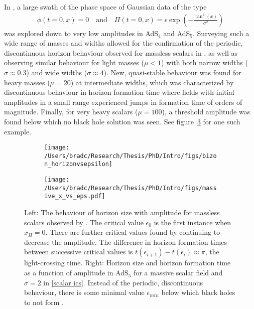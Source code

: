 \documentclass[../PhD.tex]{subfiles}
\begin{document}
In \cite{1508.02709}, a large swath of the phase space of Gaussian data of the type
\begin{align}
\label{scalar ics}
\phi(t=0,x) = 0 \quad \text{and} \quad \Pi (t=0,x) = \epsilon \exp \left( - \frac{\tan^2 (x)}{\sigma^2} \right)
\end{align}
was explored down to very low amplitudes in AdS$_4$ and AdS$_5$. Surveying such a wide range of masses and widths allowed for the confirmation of the periodic, discontinuous horizon behaviour observed for massless scalars in \cite{1104.3702}, as well as observing similar behaviour for light masses ($\mu < 1$) with both narrow widths ($\sigma \approx 0.3$) and wide widths ($\sigma \approx 4$). New, quasi-stable behaviour was found for heavy masses ($\mu = 20$) at intermediate widths, which was characterized by discontinuous behaviour in horizon formation time where fields with initial amplitudes in a small range experienced jumps in formation time of orders of magnitude. Finally, for very heavy scalars ($\mu = 100$), a threshold amplitude was found below which no black hole solution was seen. See figure~\ref{fig: massive x vs eps} for one such example.

\begin{figure}[h]
	\centering
	\begin{subfigure}[t]{0.45\textwidth}
		\texttt{[image: /Users/bradc/Research/Thesis/PhD/Intro/figs/bizon\_horizonvsepsilon]}	
		\label{fig: x vs eps}
	\end{subfigure} 
	\;
	\begin{subfigure}[t]{0.45\textwidth}
		\texttt{[image: /Users/bradc/Research/Thesis/PhD/Intro/figs/massive\_x\_vs\_eps.pdf]}
		\label{fig: massive x vs eps}
	\end{subfigure}
	\caption[Horizon size and horizon formation time for massless and massive scalars]{Left: The behaviour of horizon size with amplitude for massless scalars observed by {\rm\cite{1104.3702}}. The critical value $\epsilon_0$ is the first instance when $x_H = 0$. There are further critical values found by continuing to decrease the amplitude. The difference in horizon formation times between successive critical values is $t(\epsilon_{i+1}) - t(\epsilon_i) \approx \pi$, the light-crossing time. Right: Horizon size and horizon formation time as a function of amplitude in AdS$_5$ for a massive scalar field and $\sigma = 2$ in {\rm\eqref{scalar ics}}. Instead of the periodic, discontinuous behaviour, there is some minimal value $\epsilon_{min}$ below which black holes to not form {\rm\cite{1508.02709}}.}
\end{figure}
\end{document}
